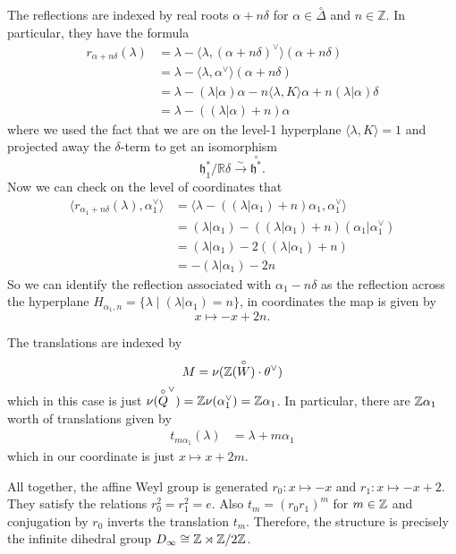 \documentclass[12pt]{article}
\begin{document}
\begin{example}
    The reflections are indexed by real roots $\alpha + n\delta$ for $\alpha \in \overset{\circ}{\Delta}$ and $n \in \mathbb{Z}$. In particular, they have the formula \begin{align*}
        r_{\alpha + n\delta}(\lambda) & = \lambda - \langle \lambda, (\alpha + n\delta)^\vee \rangle (\alpha + n\delta)                  \\
                                      & = \lambda - \langle \lambda, \alpha^\vee \rangle (\alpha + n\delta)                              \\
                                      & = \lambda - (\lambda|\alpha)\alpha - n\langle \lambda, K\rangle \alpha + n(\lambda|\alpha)\delta \\
                                      & = \lambda - ((\lambda|\alpha) + n)\alpha
    \end{align*} where we used the fact that we are on the level-1 hyperplane $\langle \lambda, K \rangle = 1$ and projected away the $\delta$-term to get an isomorphism \[\mathfrak{h}^*_1/\mathbb{R}\delta \xrightarrow{\sim} \overset{\circ}{\mathfrak{h}^*}.\] Now we can check on the level of coordinates that \begin{align*}
        \langle r_{\alpha_1 + n\delta}(\lambda), \alpha_1^\vee \rangle & = \langle \lambda - ((\lambda|\alpha_1) + n)\alpha_1, \alpha_1^\vee \rangle \\
                                                                       & = (\lambda|\alpha_1) - ((\lambda|\alpha_1) + n)(\alpha_1|\alpha_1^\vee)     \\
                                                                       & = (\lambda|\alpha_1) - 2((\lambda|\alpha_1) + n)                            \\
                                                                       & = -(\lambda|\alpha_1) - 2n
    \end{align*}
    So we can identify the reflection associated with $\alpha_1 - n\delta$ as the reflection across the hyperplane $H_{\alpha_1,n} = \{\lambda \mid (\lambda|\alpha_1) = n\}$, in coordinates the map is given by \[x \mapsto -x + 2n.\]

    The translations are indexed by \[M = \nu(\mathbb{Z}(\overset{\circ}{W})\cdot \theta^\vee)\] which in this case is just $\nu(\overset{\circ}{Q}^\vee) = \mathbb{Z} \nu(\alpha_1^\vee) = \mathbb{Z} \alpha_1$. In particular, there are $\mathbb{Z}\alpha_1$ worth of translations given by \begin{align*}
        t_{m\alpha_1}(\lambda) & = \lambda + m\alpha_1
    \end{align*} which in our coordinate is just $x \mapsto x + 2m$.

    All together, the affine Weyl group is generated $r_0:x \mapsto -x$ and $r_1:x \mapsto -x + 2$. They satisfy the relations $r_0^2 = r_1^2 = e$. Also $t_m = (r_0 r_1)^m$ for $m \in \mathbb{Z}$ and conjugation by $r_0$ inverts the translation $t_m$. Therefore, the structure is precisely the infinite dihedral group $D_\infty \cong \mathbb{Z} \rtimes \mathbb{Z}/2\mathbb{Z}$.
\end{example}
\end{document}
